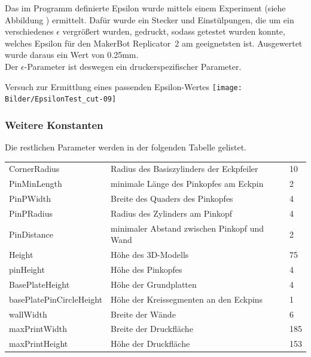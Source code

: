 Das im Programm definierte Epsilon wurde mittels einem Experiment (siehe Abbildung \thebildnr) ermittelt.
Dafür wurde ein Stecker und Einstülpungen, die um ein verschiedenes $\epsilon$ vergrößert wurden, gedruckt, sodass getestet wurden konnte, welches Epsilon für den MakerBot Replicator\texttrademark\ 2 am geeignetsten ist.
Ausgewertet wurde daraus ein Wert von 0.25mm. \\
Der $\epsilon$-Parameter ist deswegen ein druckerspezifischer Parameter.

\begin{Bild}{Versuch zur Ermittlung eines passenden Epsilon-Wertes}
		\texttt{[image: Bilder/EpsilonTest\_cut-09]}
\end{Bild}

\subsubsection{Weitere Konstanten}
Die restlichen Parameter werden in der folgenden Tabelle gelistet. \\

\begin{tabularx}{\textwidth}{|X|X|Z|}
	\hline
	 &  &  \\ 
	\hline
	CornerRadius & Radius des Basiszylinders der Eckpfeiler & 10 \\ 
	\hline 
	PinMinLength & minimale Länge des Pinkopfes am Eckpin & 2 \\ 
	\hline 
	PinPWidth & Breite des Quaders des Pinkopfes & 4 \\ 
	\hline 
	PinPRadius & Radius des Zylinders am Pinkopf & 4 \\ 
	\hline 
	PinDistance & minimaler Abstand zwischen Pinkopf und Wand & 2 \\ 
	\hline 
	Height & Höhe des 3D-Modells & 75 \\ 
	\hline 
	pinHeight & Höhe des Pinkopfes & 4 \\ 
	\hline 
	BasePlateHeight & Höhe der Grundplatten & 4 \\ 
	\hline 
	basePlatePinCircleHeight & Höhe der Kreissegmenten an den Eckpins & 1 \\ 
	\hline 
	wallWidth & Breite der Wände & 6 \\ 
	\hline 
	maxPrintWidth & Breite der Druckfläche & 185 \\ 
	\hline 
	maxPrintHeight & Höhe der Druckfläche & 153 \\  
	\hline
\end{tabularx}

